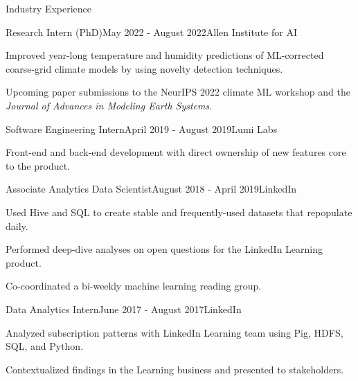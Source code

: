 \documentclass{resume} %
\begin{document}
\begin{rSection}{Industry Experience}

\begin{rSubsection}{Research Intern (PhD)}{May 2022 - August 2022}{Allen Institute for AI}{}
\item Improved year-long temperature and humidity predictions of ML-corrected coarse-grid climate models by using novelty detection techniques.
\item Upcoming paper submissions to the NeurIPS 2022 climate ML workshop and the \textit{Journal of Advances in Modeling Earth Systems}.
\end{rSubsection}

\begin{rSubsection}{Software Engineering Intern}{April 2019 - August 2019}{Lumi Labs}{}
\item Front-end and back-end development with direct ownership of new features core to the product.
\end{rSubsection}

\begin{rSubsection}{Associate Analytics Data Scientist}{August 2018 - April 2019}{LinkedIn}{}
\item Used Hive and SQL to create stable and frequently-used datasets that repopulate daily. 
\item Performed deep-dive analyses on open questions for the LinkedIn Learning product.
\item Co-coordinated a bi-weekly machine learning reading group.
\end{rSubsection}

\begin{rSubsection}{Data Analytics Intern}{June 2017 - August 2017}{LinkedIn}{}
\item Analyzed subscription patterns with LinkedIn Learning team using Pig, HDFS, SQL, and Python.
\item Contextualized findings in the Learning business and presented to stakeholders.
\end{rSubsection}

\end{rSection}





\end{document}
